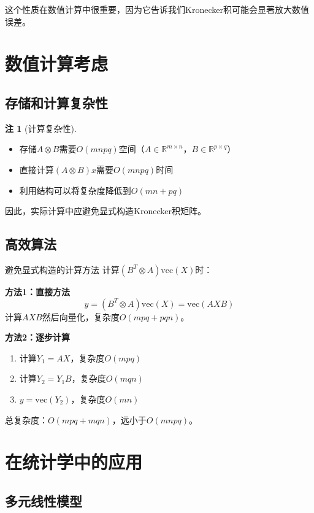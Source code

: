 \documentclass[11pt,a4paper]{ctexart}
\theoremstyle{definition}
\newtheorem{remark}{注}[section]
\newcommand{\RR}{\mathbb{R}}
\newcommand{\vect}{\text{vec}}
\begin{document}
这个性质在数值计算中很重要，因为它告诉我们Kronecker积可能会显著放大数值误差。

\section{数值计算考虑}

\subsection{存储和计算复杂性}

\begin{remark}[计算复杂性]
\begin{itemize}
\item 存储$A \otimes B$需要$O(mnpq)$空间（$A \in \RR^{m \times n}$，$B \in \RR^{p \times q}$）
\item 直接计算$(A \otimes B)x$需要$O(mnpq)$时间
\item 利用结构可以将复杂度降低到$O(mn + pq)$
\end{itemize}

因此，实际计算中应避免显式构造Kronecker积矩阵。
\end{remark}

\subsection{高效算法}

\begin{computation}{避免显式构造的计算方法}
计算$(B^T \otimes A) \vect(X)$时：

\textbf{方法1：直接方法}
$$y = (B^T \otimes A) \vect(X) = \vect(AXB)$$
计算$AXB$然后向量化，复杂度$O(mpq + pqn)$。

\textbf{方法2：逐步计算}
\begin{enumerate}
\item 计算$Y_1 = AX$，复杂度$O(mpq)$
\item 计算$Y_2 = Y_1 B$，复杂度$O(mqn)$
\item $y = \vect(Y_2)$，复杂度$O(mn)$
\end{enumerate}
总复杂度：$O(mpq + mqn)$，远小于$O(mnpq)$。
\end{computation}

\section{在统计学中的应用}

\subsection{多元线性模型}
\end{document}
